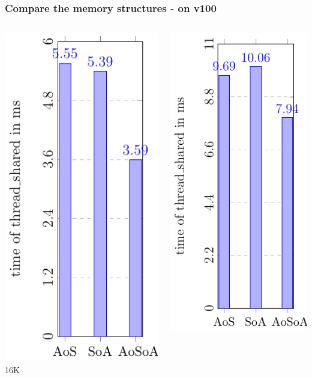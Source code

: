 \documentclass[aspectratio=169]{beamer}
\begin{document}
\begin{frame}
\end{frame}


\begin{frame}
	\frametitle{Compare the memory structures - on v100}
	\begin{columns}
	\begin{column}{0.25\textwidth}
	\includegraphics[scale=0.55]{figures/fig10.pdf}
	\small 16K
	\end{column}
	\begin{column}{0.25\textwidth}
	\includegraphics[scale=0.55]{figures/fig20.pdf}

\end{column}
\end{columns}
\end{frame}
\end{document}

